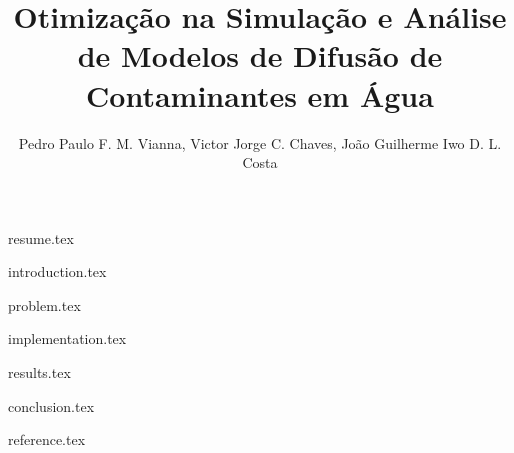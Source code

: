 \documentclass[12pt]{article}
\title{Otimização na Simulação e Análise de Modelos de Difusão de Contaminantes em Água}
\author{Pedro Paulo F. M. Vianna, Victor Jorge C. Chaves, João Guilherme Iwo D. L. Costa}
\begin{document}
\maketitle

{resume.tex}

{introduction.tex}

{problem.tex}

{implementation.tex}

{results.tex}

{conclusion.tex}

{reference.tex}
\end{document}
